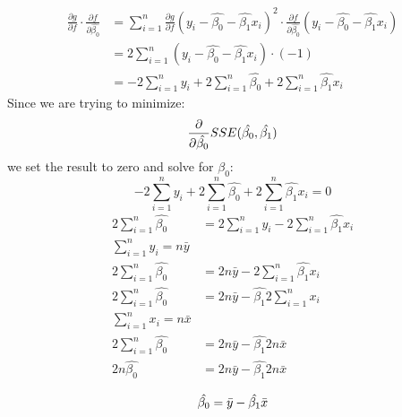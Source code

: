\documentclass{article}
\begin{document}
\begin{align*}
\frac{\partial g}{\partial f}\cdot\frac{\partial f} {\partial \hat{\beta_0}} & = 
\sum_{i=1}^{n} \frac{\partial g}{\partial f} (y_i - \hat{\beta_{0}} - \hat{\beta_{1}}x_i)^2 \cdot \frac{\partial f} {\partial \hat{\beta_0}} (y_i - \hat{\beta_{0}} - \hat{\beta_{1}}x_i) \\
& = 2 \sum_{i=1}^{n} (y_i - \hat{\beta_{0}} - \hat{\beta_{1}}x_i) \cdot 
(-1) \\
& =  -2\sum_{i=1}^{n}y_i  + 2\sum_{i=1}^{n}\hat{\beta_{0}} + 2\sum_{i=1}^{n}\hat{\beta_{1}}x_i
\end{align*}
Since we are trying to minimize:
$$
\frac{\partial}{\partial \hat{\beta_0}}SSE(\hat{\beta_0}, \hat{\beta_1}) \\
$$
we set the result to zero and solve for $\hat{\beta_0}$:
$$
 -2\sum_{i=1}^{n}y_i  + 2\sum_{i=1}^{n}\hat{\beta_{0}} + 2\sum_{i=1}^{n}\hat{\beta_{1}}x_i  = 0 
$$
\begin{align*}
2\sum_{i=1}^{n}\hat{\beta_{0}} & =  2\sum_{i=1}^{n}y_i  -  2\sum_{i=1}^{n}\hat{\beta_{1}}x_i \\
\sum_{i = 1}^{n}y_i = n\bar{y}\\
2\sum_{i=1}^{n}\hat{\beta_{0}} & =  2n\bar{y}  -  2\sum_{i=1}^{n}\hat{\beta_{1}}x_i \\
2\sum_{i=1}^{n}\hat{\beta_{0}} & =  2n\bar{y}  -  \hat{\beta_{1}}2\sum_{i=1}^{n}x_i \\
\sum_{i = 1}^{n}x_i = n\bar{x}\\
2\sum_{i=1}^{n}\hat{\beta_{0}} & =  2n\bar{y}  -  \hat{\beta_{1}}2n\bar{x} \\
2n\hat{\beta_{0}} & =  2n\bar{y}  -  \hat{\beta_{1}}2n\bar{x} \\
\end{align*}
\begin{equation}
\hat{\beta_0} =  \bar{y} - \hat{\beta_1}\bar{x} \\ \label{eq:4}
\end{equation}
\end{document}
